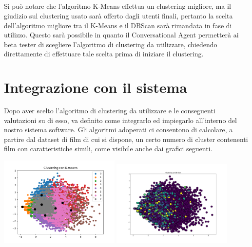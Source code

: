 \documentclass[a4paper, 10pt]{report}
\begin{document}
                \paragraph{}
                Si può notare che l'algoritmo K-Means effettua un clustering migliore, ma il giudizio sul clustering usato sarà offerto dagli
                utenti finali, pertanto la scelta dell'algoritmo migliore tra il K-Means e il DBScan sarà rimandata in fase di utilizzo.
                Questo sarà possibile in quanto il Conversational Agent permetterà ai beta tester di scegliere l'algoritmo di clustering
                da utilizzare, chiedendo direttamente di effettuare tale scelta prima di iniziare il clustering.

    \chapter{Integrazione con il sistema}\label{ch:integrazione-con-il-sistema}
        Dopo aver scelto l'algoritmo di clustering da utilizzare e le conseguenti valutazioni su di esso, va definito come
        integrarlo ed impiegarlo all'interno del nostro sistema software.
        Gli algoritmi adoperati ci consentono di calcolare, a partire dal dataset di film di cui si dispone, un certo numero di cluster
        contenenti film con caratteristiche simili, come visibile anche dai grafici seguenti.

        \begin{center}
            \includegraphics[width=6cm]{modelling/ClusterK-Means}
            \includegraphics[width=6cm]{modelling/DBScan}
        \end{center}
\end{document}

